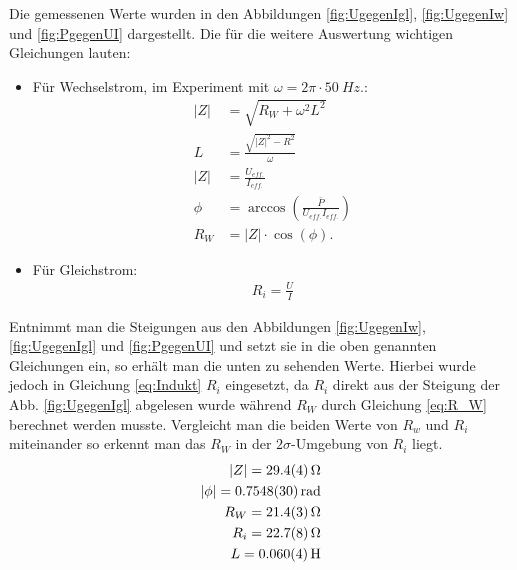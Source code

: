 Die gemessenen Werte wurden in den Abbildungen \ref{fig:UgegenIgl},  \ref{fig:UgegenIw} und \ref{fig:PgegenUI} dargestellt.
Die für die weitere Auswertung wichtigen Gleichungen lauten:
\begin{itemize}
 \item Für Wechselstrom, im Experiment mit $\omega=2\pi \cdot \SI{50}{Hz}.$:
\begin{align}
	|Z|&=\sqrt{R_W + \omega^2L^2}\\
	L&=\frac{\sqrt{|Z|^2-R^2}}{\omega}\\
	\label{eq:Indukt}
	|Z|&=\frac{U_{eff.}}{I_{eff.}}\\
	\phi &=\arccos\left(\frac{\bar{P}}{U_{eff.}I_{eff.}}\right)\\
	R_W&=|Z|\cdot \cos(\phi)	\label{eq:R_W}.
\end{align}
\item Für Gleichstrom:
\begin{align}
	R_i=\frac{U}{I}
\end{align}
\end{itemize}
Entnimmt man die Steigungen aus den Abbildungen \ref{fig:UgegenIw}, \ref{fig:UgegenIgl} und \ref{fig:PgegenUI} und setzt sie in die oben genannten Gleichungen ein, so erhält man die unten zu sehenden Werte. Hierbei wurde jedoch in Gleichung \ref{eq:Indukt} $R_i$ eingesetzt, da $R_i$ direkt aus der Steigung der Abb. \ref{fig:UgegenIgl} abgelesen wurde während $R_W$ durch Gleichung \ref{eq:R_W} berechnet werden musste. Vergleicht man die beiden Werte von $R_w$ und $R_i$ miteinander so erkennt man das  $R_W$ in der $2\sigma$-Umgebung von $R_i$ liegt. 
\begin{align}
	|Z|=\SI{29,4+-0,4}{\ohm}\\
	|\phi|=\SI{0,7548+-0,003}{rad}\\
	R_W=\SI{21,4+-0,3}{\ohm}\\
	R_i=\SI{22,7+-0,8}{\ohm}\\
	L=\SI{0,060+-0,004}{H}
\end{align}
